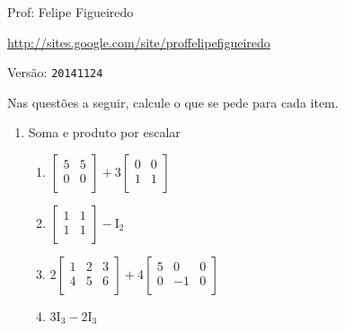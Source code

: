 \documentclass[a4paper]{article}
\begin{document}
\parbox[c]{.825\textwidth}{\raggedright%
{Prof: Felipe Figueiredo\par}
{\url{http://sites.google.com/site/proffelipefigueiredo}\par}
}

Versão: \verb|20141124|


Nas questões a seguir, calcule o que se pede para cada item.

\begin{multicols}{2}

\begin{enumerate}
\item Soma e produto por escalar

\begin{enumerate}
\item
$  \begin{bmatrix}
    5 & 5\\
    0 & 0 \\
  \end{bmatrix} +
  3 \begin{bmatrix}
    0 & 0\\
    1 & 1\\
  \end{bmatrix}
$

\item 
$
\begin{bmatrix}
  1 & 1\\
  1 & 1\\
\end{bmatrix}
- \mathrm{I}_2
$

\item 
$
2 \begin{bmatrix}
  1 & 2 & 3\\
  4 & 5 & 6\\
\end{bmatrix}
+
4 \begin{bmatrix}
 5 & 0 & 0\\
 0 & -1 & 0\\
\end{bmatrix}
$

\item 
$
3 \mathrm{I}_3 - 2 \mathrm{I}_3
$


\end{enumerate}
\end{enumerate}
\end{multicols}
\end{document}

